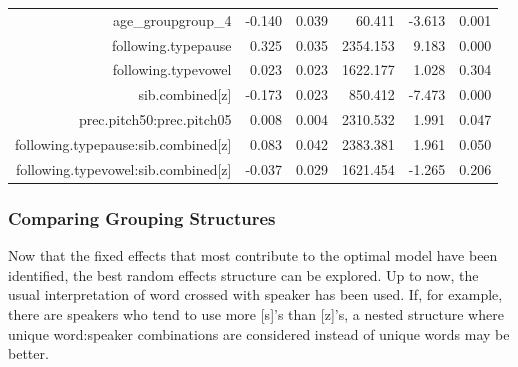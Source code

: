 \documentclass[a4paper]{article}
\begin{document}
{\begin{tabular}{rrrrrr}
$$  age\_groupgroup\_4 & -0.140 & 0.039 & 60.411 & -3.613 & 0.001 \\
  following.typepause & 0.325 & 0.035 & 2354.153 & 9.183 & 0.000 \\
  following.typevowel & 0.023 & 0.023 & 1622.177 & 1.028 & 0.304 \\
  sib.combined[z] & -0.173 & 0.023 & 850.412 & -7.473 & 0.000 \\
  prec.pitch50:prec.pitch05 & 0.008 & 0.004 & 2310.532 & 1.991 & 0.047 \\
  following.typepause:sib.combined[z] & 0.083 & 0.042 & 2383.381 & 1.961 & 0.050 \\
  following.typevowel:sib.combined[z] & -0.037 & 0.029 & 1621.454 & -1.265 & 0.206 \\
   \hline
\end{tabular}
}\endgroup\newline
\subsubsection*{Comparing Grouping Structures}
Now that the fixed effects that most contribute to the optimal model
have been identified, the best random effects structure can be
explored.  Up to now, the usual interpretation of word crossed with
speaker has been used.  If, for example, there are speakers who tend
to use more [s]'s than [z]'s, a nested structure
where unique word:speaker combinations are considered instead of unique
words may be better.\newline
\end{document}
